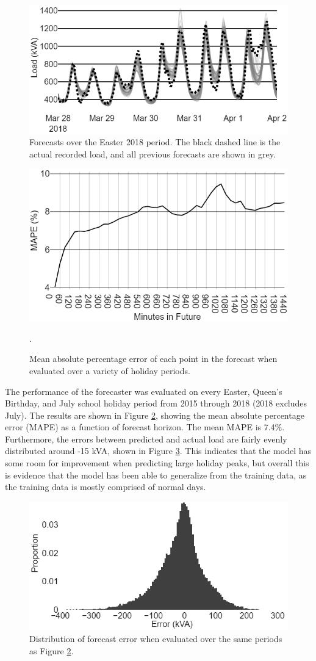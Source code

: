 \begin{figure}[htbp]
	\centerline{\includegraphics[width=.40\textwidth]{images/easter_2018_all_forecast.png}}
	\caption{Forecasts over the Easter 2018 period.
		The black dashed line is the actual recorded load, and all previous forecasts are shown in grey.}
	\label{fig:easter_forecasts}
\end{figure}

\begin{figure}[htbp]
	\centerline{\includegraphics[width=.40\textwidth]{images/bruny_mape.png}}
	\caption{Mean absolute percentage error of each point in the forecast when evaluated over a variety of holiday periods.}.
	
	\label{fig:bruny_mape}
\end{figure}

The performance of the forecaster was evaluated on every Easter, Queen's Birthday, and July school holiday period from 2015 through 2018 (2018 excludes July).
The results are shown in Figure \ref{fig:bruny_mape}, showing the mean absolute percentage error (MAPE) as a function of forecast horizon.
The mean MAPE is 7.4\%.
Furthermore, the errors between predicted and actual load are fairly evenly distributed around -15 kVA, shown in Figure \ref{fig:bruny_hist}.
This indicates that the model has some room for improvement when predicting large holiday peaks, but overall this is evidence that the model has been able to generalize from the training data, as the training data is mostly comprised of normal days.

\begin{figure}[htbp]
	\centerline{\includegraphics[width=.35\textwidth]{images/errors_histogram.png}}
	\caption{Distribution of forecast error when evaluated over the same periods as Figure \ref{fig:bruny_mape}.}
	\label{fig:bruny_hist}
\end{figure}

